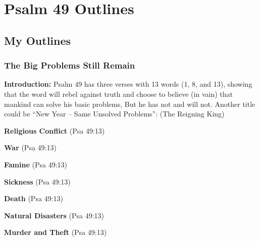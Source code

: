 \section{Psalm 49 Outlines}

\subsection{My Outlines}

\subsubsection{The Big Problems Still Remain}
\textbf{Introduction:} Psalm 49 has three verses with 13 words (1, 8, and 13), showing that the word will rebel against truth and choose to believe (in vain) that mankind can solve his basic problems, But he has not and will not. Another title could be ``New Year -- Same Unsolved Problems'':
 (The Reigning King)
\begin{compactenum}[I.][8]
    \item \textbf{Religious Conflict}  (Psa 49:13)
    \item \textbf{War}  (Psa 49:13)
    \item \textbf{Famine}  (Psa 49:13)
    \item \textbf{Sickness}  (Psa 49:13)
    \item \textbf{Death}  (Psa 49:13)
    \item \textbf{Natural Disasters}  (Psa 49:13)
    \item \textbf{Murder and Theft}  (Psa 49:13)
\end{compactenum}
